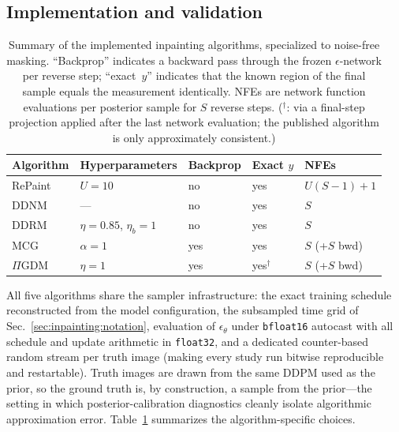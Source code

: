 \subsection{Implementation and validation}
\label{sec:inpainting:implementation}

\begin{table}[t]
  \centering
  \caption{Summary of the implemented inpainting algorithms, specialized
  to noise-free masking.  ``Backprop'' indicates a backward pass through
  the frozen $\epsilon$-network per reverse step; ``exact~$y$'' indicates
  that the known region of the final sample equals the measurement
  identically.  NFEs are network function evaluations per posterior
  sample for $S$ reverse steps.
  ($^{\dagger}$: via a final-step projection applied after the last
  network evaluation; the published algorithm is only approximately
  consistent.)}
  \label{tab:inpainters}
  \begin{tabular}{lllll}
    \toprule
    Algorithm & Hyperparameters & Backprop & Exact $y$ & NFEs \\
    \midrule
    RePaint~\cite{lugmayr2022repaint} & $U = 10$ & no  & yes & $U(S{-}1){+}1$ \\
    DDNM~\cite{wang2022ddnm}          & ---      & no  & yes & $S$ \\
    DDRM~\cite{kawar2022ddrm}         & $\eta = 0.85$, $\eta_b = 1$ & no & yes & $S$ \\
    MCG~\cite{chung2022mcg}           & $\alpha = 1$ & yes & yes & $S$ (+$S$ bwd) \\
    $\Pi$GDM~\cite{song2023pigdm}     & $\eta = 1$   & yes & yes$^{\dagger}$ & $S$ (+$S$ bwd) \\
    \bottomrule
  \end{tabular}
\end{table}

All five algorithms share the sampler infrastructure: the exact training
schedule reconstructed from the model configuration, the subsampled time
grid of Sec.~\ref{sec:inpainting:notation}, evaluation of
$\epsilon_\theta$ under \texttt{bfloat16} autocast with all schedule and
update arithmetic in \texttt{float32}, and a dedicated
counter-based random stream per truth image (making every study run
bitwise reproducible and restartable).  Truth images are drawn from the
same DDPM used as the prior, so the ground truth is, by construction, a
sample from the prior---the setting in which posterior-calibration
diagnostics cleanly isolate algorithmic approximation error.
Table~\ref{tab:inpainters} summarizes the algorithm-specific choices.

